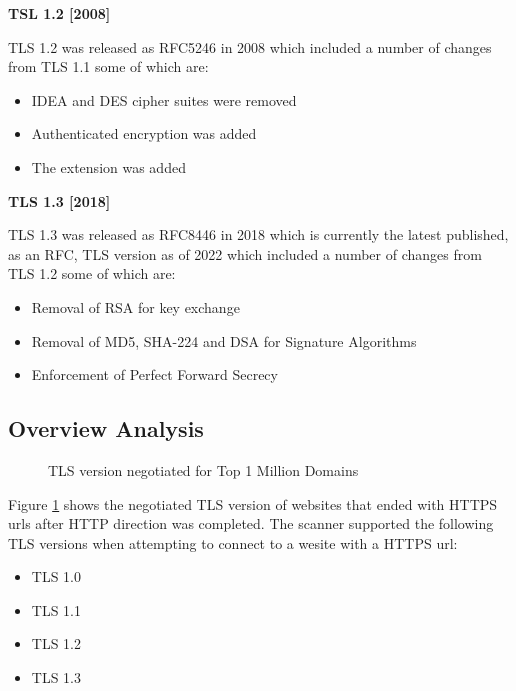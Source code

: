 \documentclass{mscreport}
\begin{document}
\vspace{0.7cm} \noindent
\textbf{TSL 1.2 [2008]}

\noindent
TLS 1.2 was released as RFC5246 in 2008 \cite{Dierks2008-uy} which included a number of changes from TLS 1.1 some of which are:
\begin{itemize}
  \setlength\itemsep{0.1em}
  \item IDEA and DES cipher suites were removed
  \item Authenticated encryption was added
  \item The extension \texttt{} was added
\end{itemize}

\vspace{0.7cm} \noindent
\textbf{TLS 1.3 [2018]}

\noindent
TLS 1.3 was released as RFC8446 in 2018 \cite{Rescorla2018-wb} which is currently the latest published, as an RFC, TLS version as of 2022 which included a number of changes from TLS 1.2 some of which are:
\begin{itemize}
  \setlength\itemsep{0.1em}
  \item Removal of RSA for key exchange
  \item Removal of MD5, SHA-224 and DSA for Signature Algorithms
  \item Enforcement of Perfect Forward Secrecy
\end{itemize}

\subsection{Overview Analysis}

\begin{figure}[H]
	\begin{center}
		\caption{TLS version negotiated for Top 1 Million Domains}
		\label{fig:tls_negotiated}
	\end{center}
\end{figure}

\noindent
Figure \ref{fig:tls_negotiated} shows the negotiated TLS version of websites that ended with HTTPS urls after HTTP direction was completed. The scanner supported the following TLS versions when attempting to connect to a wesite with a HTTPS url:

\begin{itemize}
  \setlength\itemsep{0.1em}
  \item TLS 1.0
  \item TLS 1.1
  \item TLS 1.2
  \item TLS 1.3
\end{itemize}
\end{document}
